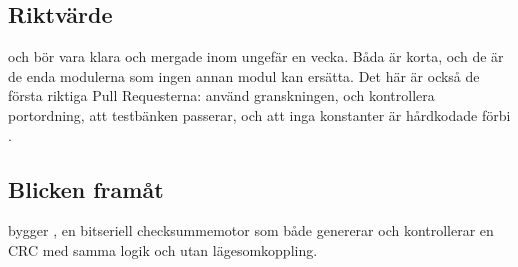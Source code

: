 \subsection*{Riktvärde}
 och  bör vara klara och mergade inom ungefär en vecka. Båda är
korta, och de är de enda modulerna som ingen annan modul kan ersätta. Det här är också de första
riktiga Pull Requesterna: använd granskningen, och kontrollera portordning, att testbänken passerar,
och att inga konstanter är hårdkodade förbi .

\subsection*{Blicken framåt}
 bygger , en bitseriell checksummemotor som både genererar och
kontrollerar en CRC med samma logik och utan lägesomkoppling.
